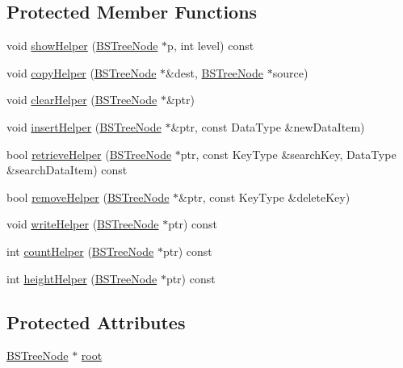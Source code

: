 \subsection*{\-Protected \-Member \-Functions}
\begin{DoxyCompactItemize}
\item 
void \hyperlink{class_b_s_tree_a44b3002e3476eb410468a4b9aaaa73ef}{show\-Helper} (\hyperlink{class_b_s_tree_1_1_b_s_tree_node}{\-B\-S\-Tree\-Node} $\ast$p, int level) const 
\item 
void \hyperlink{class_b_s_tree_ae64043d5d2d925dce95b7c8ceb801417}{copy\-Helper} (\hyperlink{class_b_s_tree_1_1_b_s_tree_node}{\-B\-S\-Tree\-Node} $\ast$\&dest, \hyperlink{class_b_s_tree_1_1_b_s_tree_node}{\-B\-S\-Tree\-Node} $\ast$source)
\item 
void \hyperlink{class_b_s_tree_a1ede33f8cbe9d1d94b479b477d95d016}{clear\-Helper} (\hyperlink{class_b_s_tree_1_1_b_s_tree_node}{\-B\-S\-Tree\-Node} $\ast$\&ptr)
\item 
void \hyperlink{class_b_s_tree_ab3d09c9969cce52974a4a65e00202061}{insert\-Helper} (\hyperlink{class_b_s_tree_1_1_b_s_tree_node}{\-B\-S\-Tree\-Node} $\ast$\&ptr, const \-Data\-Type \&new\-Data\-Item)
\item 
bool \hyperlink{class_b_s_tree_ad558bd869107eec627a5015e8361275b}{retrieve\-Helper} (\hyperlink{class_b_s_tree_1_1_b_s_tree_node}{\-B\-S\-Tree\-Node} $\ast$ptr, const \-Key\-Type \&search\-Key, \-Data\-Type \&search\-Data\-Item) const 
\item 
bool \hyperlink{class_b_s_tree_aa62fa808a54daabba878b17fe09f5378}{remove\-Helper} (\hyperlink{class_b_s_tree_1_1_b_s_tree_node}{\-B\-S\-Tree\-Node} $\ast$\&ptr, const \-Key\-Type \&delete\-Key)
\item 
void \hyperlink{class_b_s_tree_a55a1dafcd5a629264fe329a47ceabf4f}{write\-Helper} (\hyperlink{class_b_s_tree_1_1_b_s_tree_node}{\-B\-S\-Tree\-Node} $\ast$ptr) const 
\item 
int \hyperlink{class_b_s_tree_a1e5f83d364cd403d5c548e46d2b665bf}{count\-Helper} (\hyperlink{class_b_s_tree_1_1_b_s_tree_node}{\-B\-S\-Tree\-Node} $\ast$ptr) const 
\item 
int \hyperlink{class_b_s_tree_a38df91c5e55a3b39f4590ee15f375f22}{height\-Helper} (\hyperlink{class_b_s_tree_1_1_b_s_tree_node}{\-B\-S\-Tree\-Node} $\ast$ptr) const 
\end{DoxyCompactItemize}
\subsection*{\-Protected \-Attributes}
\begin{DoxyCompactItemize}
\item 
\hyperlink{class_b_s_tree_1_1_b_s_tree_node}{\-B\-S\-Tree\-Node} $\ast$ \hyperlink{class_b_s_tree_a83534afce9094181ac031f9f596a8625}{root}
\end{DoxyCompactItemize}
